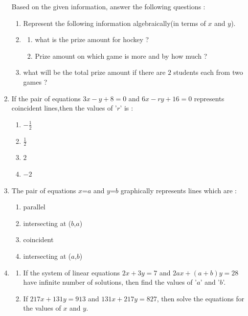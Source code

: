 \documentclass[12pt,-letter paper]{article}
\begin{document}
\begin{enumerate}
Based on the given information, answer the following questions :
\begin{enumerate}[label=(\roman*)]
    \item Represent the following information algebraically(in terms of \textit{$x$} and \textit{$y$}).
    \item\begin{enumerate}[label=(\alph*)]
\item what is the prize amount for hockey ?
\item Prize amount on which game is more and by how much ?
    \end{enumerate}
    \item what will be the total prize amount if there are $2$ students each from two games ?
\end{enumerate}
\pagebreak
\item If the pair of equations $3x - y + 8 = 0$ and $6x - ry +16 =0$ represents coincident lines,then the values of '\textit{$r$}' is :
\begin{enumerate}[label=(\alph*)]
    \item $-\frac{1}{2}$
    \item $\frac{1}{2}$
    \item $2$
    \item $-2$
\end{enumerate}
\item The pair of equations $x$=$a$ and $y$=$b$ graphically represents lines which are :
\begin{enumerate}[label=(\alph*)]
    \item parallel
    \item intersecting at ($b$,$a$)
    \item coincident
    \item intersecting at ($a$,$b$)  
\end{enumerate}
\item
\begin{enumerate}[label=(\alph*)]
\item If the system of linear equations \hspace{4pt} 
$2x + 3y = 7$\hspace{4pt}   and  \hspace{4pt} $2ax +(a + b)y =28$ \hspace{4pt}
have infinite number of solutions, then find the values of '$a$' and '$b$'.
\item  If $217x + 131y = 913$ and \hspace{4pt} 
$131x + 217y = 827$,\hspace{4pt}  then solve the equations for the values of $x$ and $y$.

\end{enumerate}
\end{enumerate}
\end{document}
